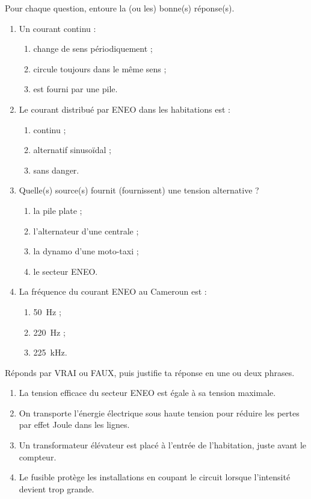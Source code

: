 \documentclass[11pt]{article}
\begin{document}
\begin{exercice}
Pour chaque question, entoure la (ou les) bonne(s) réponse(s).
\begin{enumerate}
\item Un courant continu :
\begin{enumerate}
\item change de sens périodiquement ;
\item circule toujours dans le même sens ;
\item est fourni par une pile.
\end{enumerate}
\item Le courant distribué par ENEO dans les habitations est :
\begin{enumerate}
\item continu ;
\item alternatif sinusoïdal ;
\item sans danger.
\end{enumerate}
\item Quelle(s) source(s) fournit (fournissent) une tension alternative ?
\begin{enumerate}
\item la pile plate ;
\item l'alternateur d'une centrale ;
\item la dynamo d'une moto-taxi ;
\item le secteur ENEO.
\end{enumerate}
\item La fréquence du courant ENEO au Cameroun est :
\begin{enumerate}
\item \SI{50}{Hz} ;
\item \SI{220}{Hz} ;
\item \SI{225}{kHz}.
\end{enumerate}
\end{enumerate}
\end{exercice}

\begin{exercice}
Réponds par VRAI ou FAUX, puis justifie ta réponse en une ou deux phrases.
\begin{enumerate}
\item La tension efficace du secteur ENEO est égale à sa tension maximale.
\item On transporte l'énergie électrique sous haute tension pour réduire les pertes par effet Joule dans les lignes.
\item Un transformateur élévateur est placé à l'entrée de l'habitation, juste avant le compteur.
\item Le fusible protège les installations en coupant le circuit lorsque l'intensité devient trop grande.
\end{enumerate}
\end{exercice}
\end{document}

